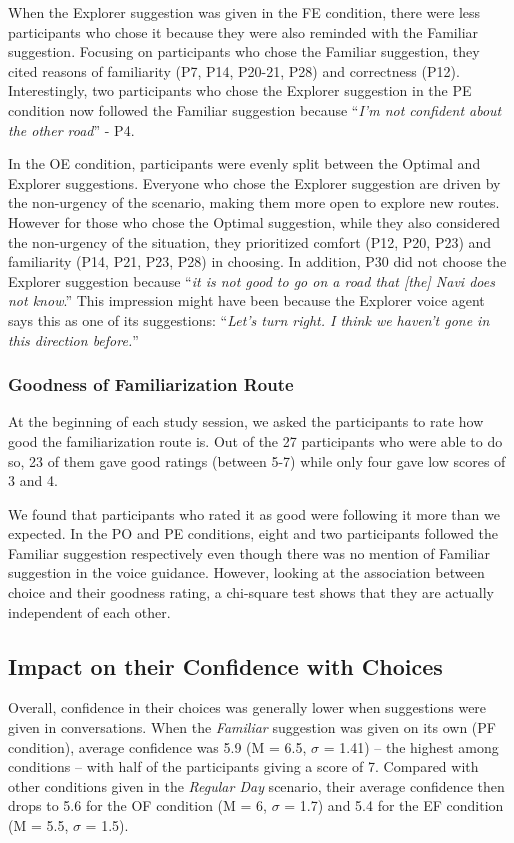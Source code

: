 When the Explorer suggestion was given in the FE condition, there were less participants who chose it because they were also reminded with the Familiar suggestion. Focusing on participants who chose the Familiar suggestion, they cited reasons of familiarity (P7, P14, P20-21, P28) and correctness (P12). Interestingly, two participants who chose the Explorer suggestion in the PE condition now followed the Familiar suggestion because ``\textit{I'm not confident about the other road}'' - P4. 

In the OE condition, participants were evenly split between the Optimal and Explorer suggestions. Everyone who chose the Explorer suggestion are driven by the non-urgency of the scenario, making them more open to explore new routes. However for those who chose the Optimal suggestion, while they also considered the non-urgency of the situation, they prioritized comfort (P12, P20, P23) and familiarity (P14, P21, P23, P28) in choosing. In addition, P30 did not choose the Explorer suggestion because ``\textit{it is not good to go on a road that [the] Navi does not know}.'' This impression might have been because the Explorer voice agent says this as one of its suggestions: ``\textit{Let's turn right. I think we haven't gone in this direction before.}''

\subsubsection{Goodness of Familiarization Route}
At the beginning of each study session, we asked the participants to rate how good the familiarization route is. Out of the 27 participants who were able to do so, 23 of them gave good ratings (between 5-7) while only four gave low scores of 3 and 4.  

We found that participants who rated it as good were following it more than we expected. In the PO and PE conditions, eight and two participants followed the Familiar suggestion respectively even though there was no mention of Familiar suggestion in the voice guidance. However, looking at the association between choice and their goodness rating, a chi-square test shows that they are actually independent of each other.

\subsection{Impact on their Confidence with Choices}
Overall, confidence in their choices was generally lower when suggestions were given in conversations. When the \textit{Familiar} suggestion was given on its own (PF condition), average confidence was 5.9 (M = 6.5, $\sigma$ = 1.41) -- the highest among conditions -- with half of the participants giving a score of 7. Compared with other conditions given in the \textit{Regular Day} scenario, their average confidence then drops to 5.6 for the OF condition (M = 6, $\sigma$ = 1.7) and 5.4 for the EF condition (M = 5.5, $\sigma$ = 1.5).

